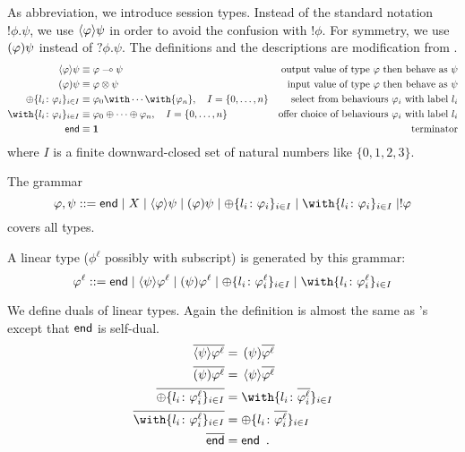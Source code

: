     As abbreviation, we introduce session types.
    Instead of the standard notation $!\phi.\psi$, we use
    $\langle{\varphi}\rangle{\psi}$ in order to avoid the confusion with
    $!\phi$.
    For symmetry, we use $(\varphi){\psi}$ instead of $?\phi.\psi$.
    The definitions and the descriptions are modification from
    \citet{wadler2012propositions}.
    \begin{align*}
     \sendtype\phi\psi&\equiv \phi\limp\psi &\text{output value of type $\phi$ then behave as $\psi$} \\
     \recvtype\phi\psi&\equiv \phi\otimes\psi &\text{input value of type $\phi$ then behave as $\psi$}\\
     \oplus\{l_i\colon \phi_i\}_{i\in I} &\equiv {\phi_0}\with
     \cdots \with {\phi_n}, \quad I = \{0,\ldots,n\} & \text{select from behaviours
     $\phi_i$ with label $l_i$}\\
     \with\{l_i\colon \phi_i\}_{i\in I} &\equiv {\phi_0}\oplus
     \cdots \oplus {\phi_n}, \quad I = \{0,\ldots,n\}& \text{offer choice of
     behaviours $\phi_i$ with label $l_i$}
     \\
     \terminate &\equiv \one &\text{terminator}
    \end{align*}
    where $I$ is a finite downward-closed set of natural numbers like
    $\{0,1,2,3\}$.


    The grammar
    \[
     \phi,\psi ::= \terminate\mid X \mid \sendtype\phi\psi \mid
     \recvtype\phi\psi
     \mid \oplus\{l_i\colon\phi_i\}_{i\in I}
     \mid \with\{l_i\colon\phi_i\}_{i\in I}
     \mid !\phi
    \]
    covers all types.

    A linear type ($\phi^\ell$ possibly with subscript) is generated by
    this grammar:
    \[
     \phi^\ell ::= \terminate\mid
     \sendtype{\psi}{\phi^\ell} \mid
     \recvtype{\psi}{\phi^\ell}
     \mid \oplus\{l_i\colon\phi^\ell_i\}_{i\in I}
     \mid \with\{l_i\colon\phi^\ell_i\}_{i\in I}
    \]

    We define duals of linear types.
    Again the definition is almost the
    same as \citet{wadler2012propositions}'s except that $\mathsf{end}$ is
    self-dual.
    \begin{align*}
     \overline{\sendtype\psi{\phi^\ell}}&= \,\recvtype\psi{\overline{\phi^\ell}}\\
     \overline{\recvtype\psi{\phi^\ell}}&= \,\sendtype\psi{\overline{\phi^\ell}}\\
     \overline{\oplus\{l_i\colon \phi^\ell_i\}_{i\in I}} &=
     \with\{l_i\colon \overline{\phi^\ell_i}\}_{i\in I} \\
     \overline{\with\{l_i\colon \phi^\ell_i\}_{i\in I}} &=
     \oplus\{l_i\colon \overline{\phi^\ell_i}\}_{i\in I} \\
     \overline{\terminate} &= \terminate\enspace.
    \end{align*}

